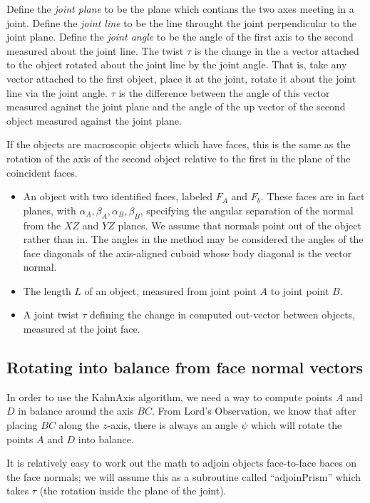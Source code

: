 \documentclass[11pt]{article}
\begin{document}
{Define the {\em joint plane} to be the plane which contians the two axes meeting in a joint.
Define the {\em joint line} to be the line throught the joint perpendicular to the joint plane.
Define the {\em joint angle} to be the angle of the first axis to the second measured about
the joint line.
The twist $\tau$ is the change in the a vector attached to the object rotated about the joint
line by the joint angle. That is, take any vector attached to the first object, place it at
the joint, rotate it about the joint line via the joint angle. $\tau$ is the difference
between the angle of this vector measured against the joint plane and the angle of the
up vector of the second object measured against the joint plane.

If the objects are macroscopic objects which have faces, this is the same as the rotation
of the axis of the second object relative to the first in the plane of the coincident faces.

\begin{itemize}
\item An object with two identified faces, labeled $F_A$ and $F_b$. These faces are in
  fact planes, with $\alpha_A, \beta_A, \alpha_B, \beta_B$, specifying the
  angular separation of the normal from the $XZ$ and $YZ$ planes. We assume that normals point out
  of the object rather than in. The angles in the method may be considered the angles of the face diagonals of the axis-aligned cuboid whose body diagonal is the vector normal.
\item The length $L$ of an object, measured from joint point $A$ to joint point $B$.
\item A joint twist $\tau$ defining the change in computed out-vector between objects,
  measured at the joint face.
\end{itemize}

\subsection{Rotating into balance from face normal vectors}

In order to use the KahnAxis algorithm, we need a way
to compute points $A$ and $D$ in balance around the axis $BC$.
From Lord's Observation, we know that after placing $BC$ along
the $z$-axis, there is always an angle $\psi$ which will
rotate the points $A$ and $D$ into balance.

It is relatively easy to work out the math to adjoin objects
face-to-face baces on the face normals; we will assume this
as a subroutine called ``adjoinPrism'' which takes $\tau$
(the rotation inside the plane of the joint). 

}
\end{document}
